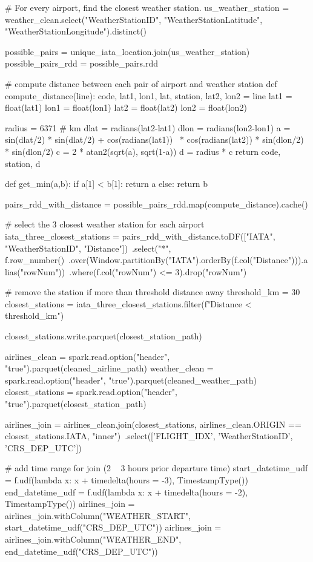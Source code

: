\documentclass[11pt]{article}
\begin{document}
# For every airport, find the closest weather station.
us_weather_station = weather_clean.select("WeatherStationID", "WeatherStationLatitude", "WeatherStationLongitude").distinct()

possible_pairs = unique_iata_location.join(us_weather_station)
possible_pairs_rdd = possible_pairs.rdd

# compute distance between each pair of airport and weather station
def compute_distance(line):
  code, lat1, lon1, lat, station, lat2, lon2 = line
  lat1 = float(lat1)
  lon1 = float(lon1)
  lat2 = float(lat2)
  lon2 = float(lon2)
  
  radius = 6371 # km
  dlat = radians(lat2-lat1)
  dlon = radians(lon2-lon1)
  a = sin(dlat/2) * sin(dlat/2) + cos(radians(lat1)) \
      * cos(radians(lat2)) * sin(dlon/2) * sin(dlon/2)
  c = 2 * atan2(sqrt(a), sqrt(1-a))
  d = radius * c
  return code, station, d

def get_min(a,b):
  if a[1] < b[1]:
    return a
  else:
    return b

pairs_rdd_with_distance = possible_pairs_rdd.map(compute_distance).cache()

# select the 3 closest weather station for each airport
iata_three_closest_stations = pairs_rdd_with_distance.toDF(["IATA", "WeatherStationID", "Distance"])\
    .select("*", f.row_number()\
    .over(Window.partitionBy("IATA").orderBy(f.col("Distance"))).alias("rowNum"))\
    .where(f.col("rowNum") <= 3).drop("rowNum")

# remove the station if more than threshold distance away
threshold_km = 30
closest_stations = iata_three_closest_stations.filter(f"Distance < {threshold_km}")

closest_stations.write.parquet(closest_station_path)%

airlines_clean = spark.read.option("header", "true").parquet(cleaned_airline_path)
weather_clean = spark.read.option("header", "true").parquet(cleaned_weather_path)
closest_stations = spark.read.option("header", "true").parquet(closest_station_path)

airlines_join = airlines_clean.join(closest_stations, 
                                 airlines_clean.ORIGIN == closest_stations.IATA, "inner")\
                                .select(['FLIGHT_IDX', 'WeatherStationID', 'CRS_DEP_UTC'])

# add time range for join (2 ~ 3 hours prior departure time)
start_datetime_udf = f.udf(lambda x: x + timedelta(hours = -3), TimestampType())
end_datetime_udf = f.udf(lambda x: x + timedelta(hours = -2), TimestampType())
airlines_join = airlines_join.withColumn("WEATHER_START", start_datetime_udf("CRS_DEP_UTC"))
airlines_join = airlines_join.withColumn("WEATHER_END", end_datetime_udf("CRS_DEP_UTC"))
\end{document}
